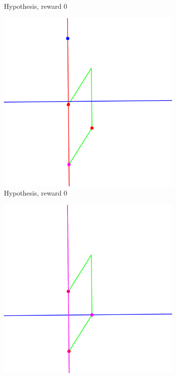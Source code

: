 \begin{figure}[!htb]
\begin{subfigure}[t]{0.32\textwidth}
         \caption{Hypothesis, reward $0$}
         \label{fig:hypotheses_explorer_hypothesis2}
     \end{subfigure}
     \hfill
     \begin{subfigure}[t]{0.32\textwidth}
         \centering
         \includegraphics[width=\textwidth]{img/hypothesis_explorer/source_08_score_0_77_PerpBisector.png}
         \caption{Hypothesis, reward $0$}
         \label{fig:hypotheses_explorer_hypothesis4}
     \end{subfigure}
     \hfill
     \begin{subfigure}[t]{0.32\textwidth}
         \centering
         \includegraphics[width=\textwidth]{img/hypothesis_explorer/source_01_score_0_999_Perpl.png}

\end{subfigure}
\end{figure}

